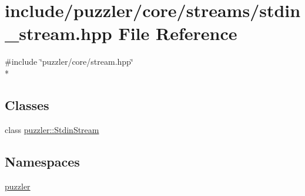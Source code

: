 \hypertarget{a00125}{}\section{include/puzzler/core/streams/stdin\+\_\+stream.hpp File Reference}
\label{a00125}
{\ttfamily \#include \char`\"{}puzzler/core/stream.\+hpp\char`\"{}}\\*
\subsection*{Classes}
\begin{DoxyCompactItemize}
\item 
class \hyperlink{a00029}{puzzler\+::\+Stdin\+Stream}
\end{DoxyCompactItemize}
\subsection*{Namespaces}
\begin{DoxyCompactItemize}
\item 
 \hyperlink{a00145}{puzzler}
\end{DoxyCompactItemize}
